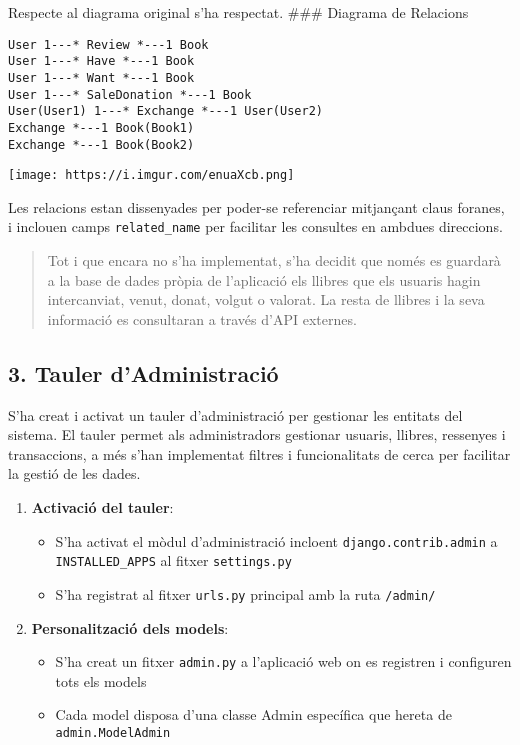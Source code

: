 Respecte al diagrama original s'ha respectat. \#\#\# Diagrama de
Relacions

\begin{verbatim}
User 1---* Review *---1 Book
User 1---* Have *---1 Book
User 1---* Want *---1 Book
User 1---* SaleDonation *---1 Book
User(User1) 1---* Exchange *---1 User(User2)
Exchange *---1 Book(Book1)
Exchange *---1 Book(Book2)
\end{verbatim}

\texttt{[image: https://i.imgur.com/enuaXcb.png]}

Les relacions estan dissenyades per poder-se referenciar mitjançant
claus foranes, i inclouen camps \texttt{related\_name} per facilitar les
consultes en ambdues direccions.

\begin{quote}
Tot i que encara no s'ha implementat, s'ha decidit que només es guardarà
a la base de dades pròpia de l'aplicació els llibres que els usuaris
hagin intercanviat, venut, donat, volgut o valorat. La resta de llibres
i la seva informació es consultaran a través d'API externes.
\end{quote}

\hypertarget{tauler-dadministraciuxf3}{%
\subsection{3. Tauler d'Administració}\label{tauler-dadministraciuxf3}}

S'ha creat i activat un tauler d'administració per gestionar les
entitats del sistema. El tauler permet als administradors gestionar
usuaris, llibres, ressenyes i transaccions, a més s'han implementat
filtres i funcionalitats de cerca per facilitar la gestió de les dades.

\begin{enumerate}
\def\labelenumi{\arabic{enumi}.}
\tightlist
\item
  \textbf{Activació del tauler}:

  \begin{itemize}
  \tightlist
  \item
    S'ha activat el mòdul d'administració incloent
    \texttt{django.contrib.admin} a \texttt{INSTALLED\_APPS} al fitxer
    \texttt{settings.py}
  \item
    S'ha registrat al fitxer \texttt{urls.py} principal amb la ruta
    \texttt{/admin/}
  \end{itemize}
\item
  \textbf{Personalització dels models}:

  \begin{itemize}
  \tightlist
  \item
    S'ha creat un fitxer \texttt{admin.py} a l'aplicació web on es
    registren i configuren tots els models
  \item
    Cada model disposa d'una classe Admin específica que hereta de
    \texttt{admin.ModelAdmin}
  \end{itemize}
\end{enumerate}

